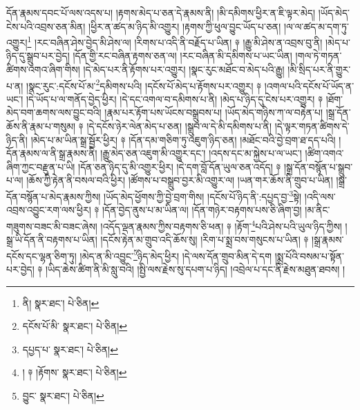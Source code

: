 དོན་རྣམས་དབང་པོ་ལས་འདས་པ། །རྟགས་མེད་པ་ཅན་དེ་རྣམས་ནི། །མི་དམིགས་ཕྱིར་ན་ཇི་ལྟར་མེད། །ཡོད་མེད་ངེས་པའི་འབྲས་ཅན་མིན། །ཕྱིར་ན་ཚད་མ་ཉིད་མི་འགྱུར། །རྟགས་ཀྱི་ཕུལ་བྱུང་ཡོད་པ་ཅན། །ལ་ལ་ཚད་མ་དག་ཏུ་འགྱུར།\footnote{ནི།  སྣར་ཐང་།  པེ་ཅིན། } །རང་བཞིན་ཤེས་བྱེད་མི་ཤེས་ལ། །རིགས་པ་འདི་ནི་བརྗོད་པ་ཡིན། ༈ །རྒྱུ་མི་ཤེས་ན་འབྲས་བུ་ནི། །མེད་པ་ཉིད་དུ་སྒྲུབ་པར་བྱེད། །དོན་གྱི་རང་བཞིན་རྟགས་ཅན་ལ། །རང་བཞིན་མི་དམིགས་པ་ཡང་ཡིན། །གལ་ཏེ་གཏན་ཚིགས་འགའ་ཞིག་གིས། །དེ་མེད་པར་ནི་རྟོགས་པར་འགྱུར། །སྣང་རུང་མཐོང་བ་མེད་པའི་རྒྱུ། །མི་སྲིད་པར་ནི་གྱུར་པ་ན། །སྣང་རུང་:དངོས་པོ་མ་\footnote{དངོས་པོ་མི་  སྣར་ཐང་།  པེ་ཅིན། }དམིགས་པའི། །དངོས་པོ་མེད་པ་རྟོགས་པར་འགྱུར། ༈ །འགལ་པའི་དངོས་པོ་ཡོད་ན་ཡང་། །དེ་ཡོད་པ་ལ་གནོད་བྱེད་ཕྱིར། །དེ་དང་འགལ་བ་དམིགས་པ་ནི། །མེད་པ་ཉིད་དུ་ངེས་པར་འགྱུར། ༈ །ཐོག་མེད་བག་ཆགས་ལས་བྱུང་བའི། །རྣམ་པར་རྟོག་པས་ཡོངས་བསྒྲུབས་པ། །ཡོད་མེད་གཉིས་ཀ་ལ་བརྟེན་པ། །སྒྲ་དོན་ཆོས་ནི་རྣམ་པ་གསུམ། ༈ །དེ་དངོས་ཉེར་ལེན་མེད་པ་ཅན། །སྒྲུབ་ལ་དེ་མི་དམིགས་པ་ནི། །དེ་ལྟར་གཏན་ཚིགས་དེ་ཉིད་ནི། །མེད་པ་མ་ཡིན་སྒྲ་སྦྱོར་ཕྱིར། ༈ །དོན་དམ་གཅིག་ཏུ་འཇུག་ཉིད་ཅན། །མཐོང་བའི་བྱེ་བྲག་ཐ་དད་པའི། །དོན་རྣམས་ལ་ནི་སྒྲ་རྣམས་ནི། །རྒྱུ་མེད་ཅན་འཇུག་མི་འགྱུར་དང་། །འདས་དང་མ་སྐྱེས་པ་ལ་ཡང་། །ཚིག་འགའ་ཞིག་ཀྱང་བརྫུན་པ་ཡི། །དོན་ཅན་ཉིད་དུ་མི་འགྱུར་ཕྱིར། །དེ་དག་བློ་དོན་ཡུལ་ཅན་འདོད། ༈ །སྒྲ་དོན་བསྙོན་པ་སྒྲུབ་པ་ལ། །ཆོས་ཀྱི་རྟེན་ནི་བསལ་བའི་ཕྱིར། །ཚོགས་པ་བསྒྲུབ་བྱར་མི་འགྱུར་ལ། །ཡན་གར་ཆོས་ནི་གྲུབ་པ་ཡིན། །སྒྲ་དོན་བསྙོན་པ་མེད་རྣམས་ཀྱིས། །ཡོད་མེད་ཕྱོགས་ཀྱི་བྱེ་བྲག་གིས། །དངོས་པོ་ཉིད་ནི་:དཔྱད་བྱ་\footnote{དཔྱད་པ་  སྣར་ཐང་།  པེ་ཅིན། }སྟེ། །འདི་ལས་འབྲས་འབྱུང་རག་ལས་ཕྱིར། ༈ །དོན་བྱེད་ནུས་པ་མ་ཡིན་ལ། །དོན་གཉེར་བརྟགས་པས་ཅི་ཞིག་བྱ། །མ་ནིང་གཟུགས་བཟང་མི་བཟང་ཞེས། །འདོད་ལྡན་རྣམས་ཀྱིས་བརྟགས་ཅི་ཕན། ༈ །རྟོག་\footnote{། ༈ །རྟོགས་  སྣར་ཐང་།  པེ་ཅིན། }པའི་ཤེས་པའི་ཡུལ་ཉིད་ཀྱིས། །སྒྲ་ཡི་དོན་ནི་བརྟགས་པ་ཡིན། །དངོས་རྟེན་མ་གྲུབ་འདི་ཆོས་སུ། །རིག་པ་སྨྲ་བས་གསུངས་པ་ཡིན། ༈ །སྒྲ་རྣམས་དངོས་དང་ལྷན་ཅིག་ཏུ། །མེད་ན་མི་འབྱུང་\footnote{བྱུང་  སྣར་ཐང་།  པེ་ཅིན། }ཉིད་མེད་ཕྱིར། །དེ་ལས་དོན་གྲུབ་མིན་དེ་དག །སྨྲ་པོའི་བསམ་པ་སྟོན་པར་བྱེད། ༈ །ཡིད་ཆེས་ཚིག་ནི་མི་སླུ་བའི། །སྤྱི་ལས་རྗེས་སུ་དཔག་པ་ཉིད། །འབྲེལ་པ་དང་ནི་རྗེས་མཐུན་ཐབས། །
